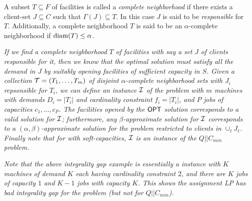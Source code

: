 \begin{definition} \label{fdef:comp-nbr}
	A subset $T\subseteq F$ of facilities is called a {\em complete neighborhood} if there exists a client-set $J\subseteq C$ such that $\Gamma(J) \subseteq T$.
	In this case $J$ is said to be {\em responsible} for $T$. Additionally, a complete neighborhood $T$ is said to be an $\alpha$-complete neighborhood if $\mathrm{diam}(T) \leq \alpha$.
\end{definition}
\begin{remark}\label{frem:red}
	\emph{
If we find a complete neighborhood $T$ of facilities with say a set $J$ of clients responsible for it, then we know that the optimal solution must satisfy all the demand in $J$ by suitably opening facilities of sufficient capacity in $S$. Given a collection ${\cal T} = (T_1,\ldots,T_m)$ of disjoint $\alpha$-complete neighborhood sets with $J_i$ repsonsible for $T_i$, we can define an instance ${\cal I}$ of the \cckp problem with $m$ machines with demands $D_i = |T_i|$ and cardinality constraint $f_i = |T_i|$, and $P$ jobs of capacities $c_1,\ldots,c_P$. The facilities opened by the $\mathsf{OPT} $ solution corresponds to a valid solution for ${\cal I}$; furthermore, any $\beta$-approximate solution for ${\cal I}$ corresponds to a $(\alpha,\beta)$-approximate solution for the \mckc problem restricted to clients in $\cup_{\ell} J_\ell$. Finally note that for \mckc with soft-capacities, ${\cal I}$ is an instance of the $Q||C_{min}$ problem.
}

\emph{
Note that the above integrality gap  example is essentially a \cckp instance with $K$ machines of demand $K$ each having cardinality constraint $2$, and there are $K$ jobs of capacity $1$ and $K-1$ jobs with capacity $K$. This shows the assignment LP has bad integrality gap for the \cckp problem (but not for $Q||C_{min}$).}
\end{remark}


